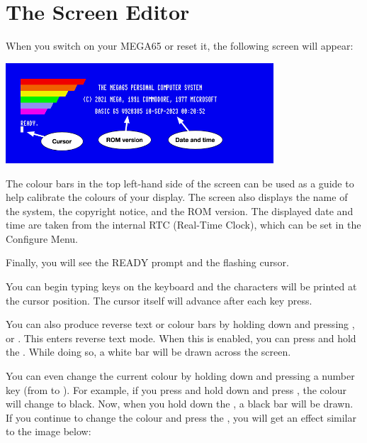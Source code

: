 \section{The Screen Editor}
\label{sec:screen-editor}

When you switch on your MEGA65 or reset it, the following screen will appear:

\begin{center}
\includegraphics[width={10cm}]{images/introduction-screen/layout.png}
\end{center}

The colour bars in the top left-hand side of the screen can be used
as a guide to help calibrate the colours of your display.
The screen also displays the name of the system,
the copyright notice, and the ROM version.
The displayed date and time are taken from the internal RTC
(Real-Time Clock), which can be set in the Configure Menu.

Finally, you will see the READY prompt and the flashing cursor.

You can begin typing keys on the keyboard and the characters will be
printed at the cursor position. The cursor itself will advance after
each key press.

You can also produce reverse text or colour bars by holding down  and pressing , or . This enters reverse text mode. When this is enabled, you can press and hold the . While doing so, a white bar will be drawn across the screen.

You can even change the current colour by holding  down and pressing a number key (from  to ). For example, if you press and hold  down and press , the colour will change to black. Now, when you hold down the , a black bar will be drawn. If you continue to change the colour and press the , you will get an effect similar to the image below:


